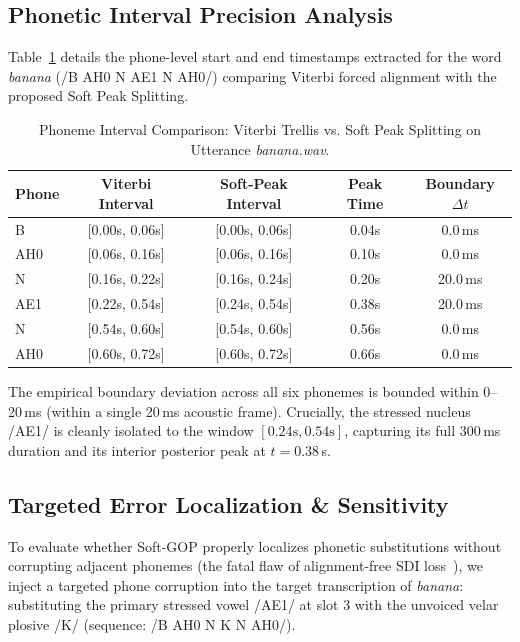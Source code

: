 \documentclass[10pt,conference]{IEEEtran}
\begin{document}
\subsection{Phonetic Interval Precision Analysis}
Table~\ref{tab:phone_intervals} details the phone-level start and end timestamps extracted for the word \textit{banana} (/B AH0 N AE1 N AH0/) comparing Viterbi forced alignment with the proposed Soft Peak Splitting.

\begin{table}[h]
\caption{Phoneme Interval Comparison: Viterbi Trellis vs. Soft Peak Splitting on Utterance \textit{banana.wav}.}
\label{tab:phone_intervals}
\centering
\begin{tabular}{lcccc}
\toprule
\textbf{Phone} & \textbf{Viterbi Interval} & \textbf{Soft-Peak Interval} & \textbf{Peak Time} & \textbf{Boundary $\Delta t$} \\
\midrule
B   & [0.00s, 0.06s] & [0.00s, 0.06s] & 0.04s & 0.0\,ms \\
AH0 & [0.06s, 0.16s] & [0.06s, 0.16s] & 0.10s & 0.0\,ms \\
N   & [0.16s, 0.22s] & [0.16s, 0.24s] & 0.20s & 20.0\,ms \\
AE1 & [0.22s, 0.54s] & [0.24s, 0.54s] & 0.38s & 20.0\,ms \\
N   & [0.54s, 0.60s] & [0.54s, 0.60s] & 0.56s & 0.0\,ms \\
AH0 & [0.60s, 0.72s] & [0.60s, 0.72s] & 0.66s & 0.0\,ms \\
\bottomrule
\end{tabular}
\end{table}

The empirical boundary deviation across all six phonemes is bounded within 0--20\,ms (within a single 20\,ms acoustic frame). Crucially, the stressed nucleus /AE1/ is cleanly isolated to the window $[0.24\text{s}, 0.54\text{s}]$, capturing its full 300\,ms duration and its interior posterior peak at $t = 0.38$\,s.

\subsection{Targeted Error Localization \& Sensitivity}
To evaluate whether Soft-GOP properly localizes phonetic substitutions without corrupting adjacent phonemes (the fatal flaw of alignment-free SDI loss~\cite{cao2024framework}), we inject a targeted phone corruption into the target transcription of \textit{banana}: substituting the primary stressed vowel /AE1/ at slot 3 with the unvoiced velar plosive /K/ (sequence: /B AH0 N K N AH0/).
\end{document}
